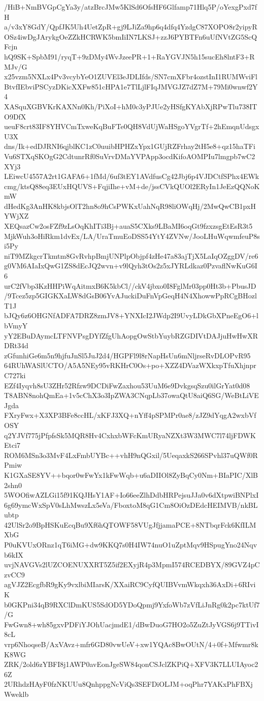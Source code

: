 /HiB+NmBVGpCgYa3y/atzBrcJMw5KlSd6OfsHF6Glfamp71Hlq5P/oYexgPxd7fH
a/v3xY8GdY/QpfJK5Uh4UetZpR+gj9LJiZa9hp6q4dfq4YzdgC87XOPO8r2yipyR
OSz4iwDgJArykgOeZZkHCRWK5bmIiIN7LKSJ+zzJ6PYBTFn6uUfNVtZG5ScQFcjn
hQ9SK+SpbM91/ryqT+9zDMy4WvJzeePR+1+RaYGVJN5h15sucEh8lntF3+RMJv/G
x25vzm5NXLx4Pv3vcybYeO1ZUVEl3eJDLIfds/SN7cmXFbr4ozstInI1RUMWviFl
BtvfIEbviPSCyzDKicXXFw851cHPA1e7TlLjlFIqJMVGJZ7dZ7M+79Mi0wnwf2Y4
XASquXGBVKrKAXNn0Kh/PiXoI+hM0c3yPJUe2yHSfgKYAbXjRPwTlu738ITO9DfX
ueuF8crt83IF8YHVCmTxweKqBuFTe0QH8VdUjWaHSgoYVgrTf+2hEmqnUdsgxU3X
dns/Ik+edDJRNI6qjblKC1zC0uuibHPHZxYpx1GUjRZFrhay2tH5e8+qz15haTFi
Vu6STXqSKOgG2CdtunrRf0SuVrvDMaYVPApp3ocdKifoAOMPIu7lmgpb7wC2XYj3
LEiwcU4557A2rt1GAFA6+1fMd/6uf3tEY1AVdfusCg42Jbj6p4VJDCtfSPhx4EWk
cmg/ktsQ88eq3EUxHQUVS+FqjiIhe+vM+de/jssCVkQUOl2ERyIn1JeEzQQNoKmW
dHedKg3AnHK8kbjsOlT2hn8o9hCsPWKxUahNqR98liOWqHj/2MwQwCB1pxHYWjXZ
XEQsazCw2osFZf9zLsOqKhITi3Bj+auaS5CXks9LBaMI6oqGt9fzxzsgEtEsR3t5
MjkWuh3oHiRkm1dvEx/LA/UraTmuEoDSS54YtY4ZVNw/JooLHuWqwmfeuP8si5Py
niT9MZkgcrTkmtm8GvRvhpBmjUNPlpObjpf4zHe47a83ajTjX5LaIqOZggDV/re6
g0VM6AIaIxQwG1ZS8dEcJQ2wvn+v9lQyh3tOs2z5xJYRLdkaz0PzvaflNwKuG6I6
urC2fVbp3KzHHPiWqAitmxB6K5kbCl//ckV4jbxo0I8FglMr03pp0Ht3b+PbusJD
/9Tcez5zp5GIGKXaLW8dGsB06YvAJuckiDuFnVpGeqH4N4XhowwPpRCgBHozlT1J
bJQy6z6OHGNfADFA7DRZ8zmJV8+YNXIcI2JWdp2I9UvyLDkGbXPneEgO6+lbVmyY
yY2EBuDAymcLTFNVPsgDYfZfgUhAopgOwStbYuybRZGDIVtDAJjuHwHwXRDRt34d
zGfunhiGe6m5n9hjfuJnSl5JuJ2d4/HGPFl9l8rNapHsUn6mNljrseRvDLOPvR95
64RUhWASlUCTO/A5A5NEy95vRKHrC0Os+po+XZZ4DVazWXkxpTfuXhjnprC727ki
EZf4Iyqvh8sU3ZHr52Rfzw9DCDiFwZaxhou53UuM6e9DvkgsqSzu0ilGrYat0d08
T8ABN8nohQmEa+1v5cChX3o3IpZWA3CNqpLb37owaQtU8aiQ6SG/WeBtLiVEJgda
FXryFwx+X3XP3BFe8ccHL/xKFJ3XQ+nYff4pSPMPr0ae8/zJZ9dYqgA2wxbVfOSY
q2YJVf775jPfpfsSk5MQR8Hv4CxhxbWFcKmURyaNZXt3W3MWC7l74ljFDWKEtci7
ROM6MSn3o3MvF4LxFmbUYBc++vhH9nQGxil/5UeqaxkS266SPvhl37uQWf0RPmiw
K1GXaSE8YV++bqor0wFwYx1kFwWqb+u6aDIIOl8ZyBqCy0Nm+BIaPIC/XlB2shn0
5WOOfiwAZLGi15f91KQJHsY1AF+Io66eeZlhDdbHRPejsuJJa0v6dXtpwiBNPlxI
6g69ymcWxSpV0sLhMwszLx5eVa/FboxtoM8qG1Cm8OiOzDEdcHEIMVB/nkBLubtp
42UlSr2o9BpHSKuEcqBu9Xf6hQTOWF58VUgJfjjamaPCE+8NTbqrFck6KfILMXbG
P0uKVUxORnz1qT6iMG+dw9KKQ7s0H4IW74nuO1uZptMqv9HSpugYno24Nqvb6kIX
uvjNAVGVs2lUZCOENUXXRT5Z5if2EXyjR4p3MpmI574RCEDBYX/89GVZ4pCzvCC9
agVJZ2EcgfbR9gKy9vxlbiMIarsK/XXaiRC9CyfQUIBVvmWkqxh36AxDi+6RIviK
b0GKPni34qB9RXClDmKUS5SdOD5YDoQpmj9YxfoWb7zVfLiJnRg0k2pc7ktUf7/G
FwGwn8+wh85gxvPDFiYJOhUacjmdE1/dBwDuoG7HO2o5ZuZtJyVGS6j9TTivI8cL
vrp6NhoqseB/AxVAvz+mfr6GD80vwUeV+xw1YQAc8BwOUtN/4+0f+Mfwmr8kK8WG
ZRK/2old6zYBFI8j1AWP0avEonJgeSW84qonCSJclZKPiQ+XFV3K7LLUIAyoc26Z
2URhdzHAyF0fzNKUUu8QnhppgNcViQs3SEFDiOLJM+oqPhr7YAKxPhFBXjWweklb

